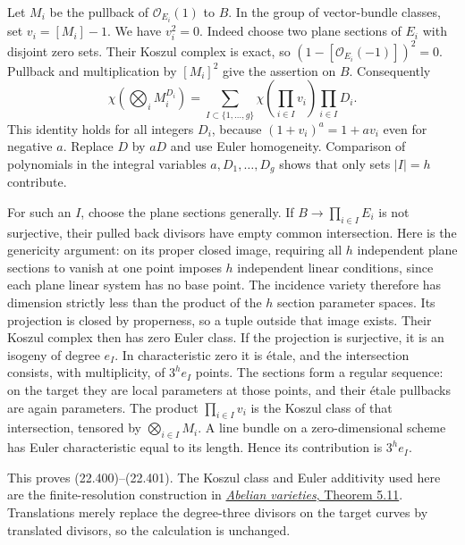 \documentclass[
  11pt,
  a4paper,
]{article}
\begin{document}
Let \(M_i\) be the pullback of \(\mathcal O_{E_i}(1)\) to \(B\). In the
group of vector-bundle classes, set \(v_i=[M_i]-1\). We have
\(v_i^2=0\). Indeed choose two plane sections of \(E_i\) with disjoint
zero sets. Their Koszul complex is exact, so
\((1-[\mathcal O_{E_i}(-1)])^2=0\). Pullback and multiplication by
\([M_i]^2\) give the assertion on \(B\). Consequently \[
 \chi\left(\bigotimes_i M_i^{D_i}\right)
       =\sum_{I\subset\{1,\ldots,g\}}
          \chi\left(\prod_{i\in I}v_i\right)
          \prod_{i\in I}D_i.
 \tag{22.403}
\] This identity holds for all integers \(D_i\), because
\((1+v_i)^a=1+av_i\) even for negative \(a\). Replace \(D\) by \(aD\)
and use Euler homogeneity. Comparison of polynomials in the integral
variables \(a,D_1,\ldots,D_g\) shows that only sets \(|I|=h\)
contribute.

For such an \(I\), choose the plane sections generally. If
\(B\to\prod_{i\in I}E_i\) is not surjective, their pulled back divisors
have empty common intersection. Here is the genericity argument: on its
proper closed image, requiring all \(h\) independent plane sections to
vanish at one point imposes \(h\) independent linear conditions, since
each plane linear system has no base point. The incidence variety
therefore has dimension strictly less than the product of the \(h\)
section parameter spaces. Its projection is closed by properness, so a
tuple outside that image exists. Their Koszul complex then has zero
Euler class. If the projection is surjective, it is an isogeny of degree
\(e_I\). In characteristic zero it is étale, and the intersection
consists, with multiplicity, of \(3^h e_I\) points. The sections form a
regular sequence: on the target they are local parameters at those
points, and their étale pullbacks are again parameters. The product
\(\prod_{i\in I}v_i\) is the Koszul class of that intersection, tensored
by \(\bigotimes_{i\in I}M_i\). A line bundle on a zero-dimensional
scheme has Euler characteristic equal to its length. Hence its
contribution is \(3^h e_I\).

This proves (22.400)--(22.401). The Koszul class and Euler additivity
used here are the finite-resolution construction in
\href{https://github.com/KokunoYumeto/open-math-courses-public/blob/146dc81802e69cf262fb6cc65c1b9f74e71f4625/docs/courses/AG-GS/src/abelian-varieties.md\#how-much-projective-space-is-necessary}{\emph{Abelian
varieties}, Theorem 5.11}. Translations merely replace the degree-three
divisors on the target curves by translated divisors, so the calculation
is unchanged.
\end{document}

